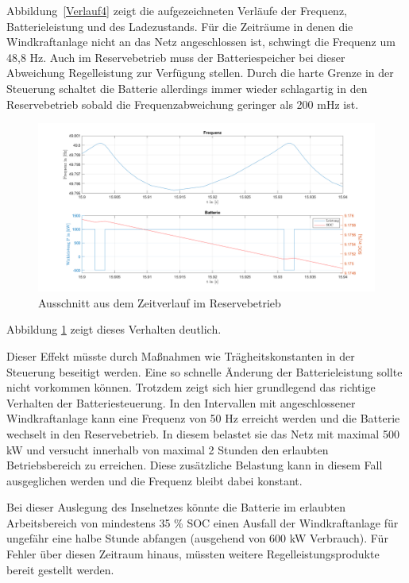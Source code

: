 Abbildung~\ref{Verlauf4} zeigt die aufgezeichneten Verläufe der Frequenz, Batterieleistung und des Ladezustands.
Für die Zeiträume in denen die Windkraftanlage nicht an das Netz angeschlossen ist, schwingt die Frequenz um 48,8 Hz.
Auch im Reservebetrieb muss der Batteriespeicher bei dieser Abweichung Regelleistung zur Verfügung stellen.
Durch die harte Grenze in der Steuerung schaltet die Batterie allerdings immer wieder schlagartig in den Reservebetrieb sobald 
die Frequenzabweichung geringer als 200 mHz ist.
\begin{figure}
	 \centering
	 \includegraphics[width=14cm]{Abbildungen/FreqBat5.png}
	 \caption{Ausschnitt aus dem Zeitverlauf im Reservebetrieb}\label{Verlauf5}
\end{figure}
Abbildung \ref{Verlauf5} zeigt dieses Verhalten deutlich.

Dieser Effekt müsste durch Maßnahmen wie Trägheitskonstanten in der Steuerung beseitigt werden.
Eine so schnelle Änderung der Batterieleistung sollte nicht vorkommen können.
Trotzdem zeigt sich hier grundlegend das richtige Verhalten der Batteriesteuerung.
In den Intervallen mit angeschlossener Windkraftanlage kann eine Frequenz von 50 Hz erreicht werden und die Batterie 
wechselt in den Reservebetrieb. 
In diesem belastet sie das Netz mit maximal 500 kW und versucht innerhalb von maximal 2 Stunden den erlaubten Betriebsbereich zu erreichen.
Diese zusätzliche Belastung kann in diesem Fall ausgeglichen werden und die Frequenz bleibt dabei konstant.

Bei dieser Auslegung des Inselnetzes könnte die Batterie im erlaubten Arbeitsbereich von mindestens 35 \% SOC
einen Ausfall der Windkraftanlage für ungefähr eine halbe Stunde abfangen (ausgehend von 600 kW Verbrauch).
Für Fehler über diesen Zeitraum hinaus, müssten weitere Regelleistungsprodukte bereit gestellt werden.

